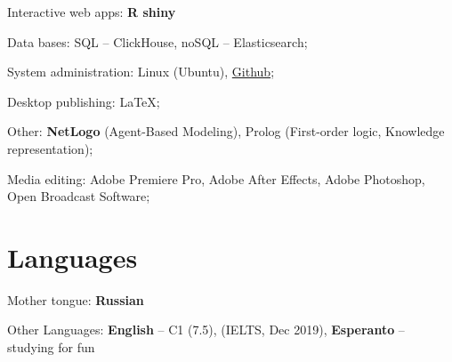 \documentclass[a4paper, extended]{adcv}
\begin{document}
Interactive web apps: \textbf{R shiny}

Data bases: SQL -- ClickHouse, noSQL -- Elasticsearch;

System administration: Linux (Ubuntu), \href{https://github.com/vvseva/}{Github};

Desktop publishing: \LaTeX;
  
Other: \textbf{NetLogo} (Agent-Based Modeling), Prolog (First-order logic, Knowledge representation);
  
Media editing: Adobe Premiere Pro, Adobe After Effects, Adobe Photoshop, Open Broadcast Software;
\fi

\section{Languages}

Mother tongue: \textbf{Russian} 

Other Languages: \textbf{English} -- C1 (7.5), (IELTS, Dec 2019), \textbf{Esperanto} -- studying for fun


\end{document}
